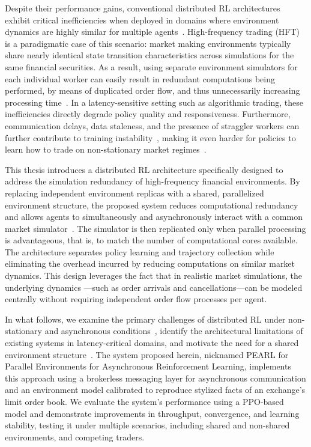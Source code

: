 Despite their performance gains, conventional distributed RL architectures exhibit critical inefficiencies when
deployed in domains where environment dynamics are highly similar for multiple agents~\citep{AlSaffar2023,Lu2024}.
High-frequency trading (HFT) is a paradigmatic case of this scenario: market making environments typically share nearly
identical state transition characteristics across simulations for the same financial securities.
As a result, using separate environment simulators for each individual worker can easily result in redundant computations being performed,
by means of duplicated order flow, and thus unnecessarily increasing processing time~\citep{Hou2025}.
In a latency-sensitive setting such as algorithmic trading, these inefficiencies directly degrade policy quality and responsiveness.
Furthermore, communication delays, data staleness, and the presence of straggler workers can further contribute to training instability~\citep{He2022,Xie2023},
making it even harder for policies to learn how to trade on non-stationary market regimes~\citep{Borzilov2025}.

This thesis introduces a distributed RL architecture specifically designed to address the simulation redundancy of high-frequency financial environments.
By replacing independent environment replicas with a shared, parallelized environment structure,
the proposed system reduces computational redundancy and allows agents to simultaneously and asynchronously interact with a common market simulator~\citep{Yin2024,Hou2025}.
The simulator is then replicated only when parallel processing is advantageous, that is,
to match the number of computational cores available.
The architecture separates policy learning and trajectory collection while eliminating the overhead incurred by reducing computations on similar market dynamics.
This design leverages the fact that in realistic market simulations, the underlying dynamics
---such as order arrivals and cancellations---can be modeled centrally without requiring independent order flow processes per agent.

In what follows, we examine the primary challenges of distributed RL under non-stationary and asynchronous conditions~\citep{Huh2023},
identify the architectural limitations of existing systems in latency-critical domains, and motivate the need for a shared environment structure~\citep{Cho2023,Furukawa2022}.
The system proposed herein, nicknamed PEARL for Parallel Environments for Asynchronous Reinforcement Learning,
implements this approach using a brokerless messaging layer for asynchronous communication and an environment model
calibrated to reproduce stylized facts of an exchange's limit order book.
We evaluate the system's performance using a PPO-based model and demonstrate improvements in
throughput, convergence, and learning stability, testing it under multiple scenarios, including shared and non-shared environments, and competing traders.


